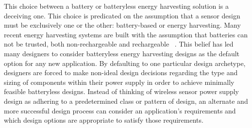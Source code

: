 This choice between a battery or batteryless energy harvesting solution is a deceiving one.
This choice is predicated on the assumption that a sensor design must be exclusively one or the other: battery-based or energy harvesting.
Many recent energy harvesting systems are built with the assumption that batteries can not be trusted, both non-rechargeable and rechargeable
~\cite{hesterNew17, hesterTragedy15, hesterFlicker17, hesterTimely17, hester2017future, colinReconfigurable18, luciaIntermittent17, yervaGrafting12, majid2020continuous}.
This belief has led many designers to consider batteryless energy harvesting designs as the default option for any new application. By defaulting to one particular design archetype, designers are forced to make non-ideal design decisions regarding the type and sizing of components within their power supply in order to achieve minimally feasible batteryless designs.
Instead of thinking of wireless sensor power supply design as adhering to a predetermined class or pattern of design, an alternate and more successful design process can consider an application's requirements and which design options are appropriate to satisfy those requirements. 

